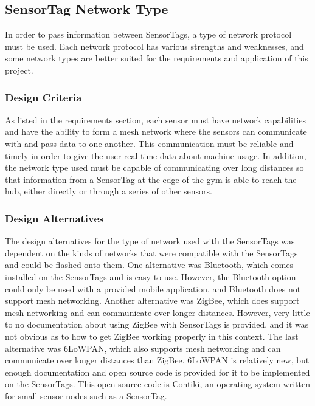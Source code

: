 \documentclass[PPFS.tex]{template/subfiles}
\begin{document}
\subsection{SensorTag Network Type}
In order to pass information between SensorTags, a type of network protocol must be used. Each network protocol has various strengths and weaknesses, and some network types are better suited for the requirements and application of this project.

\subsubsection{Design Criteria}
As listed in the requirements section, each sensor must have network capabilities and have the ability to form a mesh network where the sensors can communicate with and pass data to one another. This communication must be reliable and timely in order to give the user real-time data about machine usage. In addition, the network type used must be capable of communicating over long distances so that information from a SensorTag at the edge of the gym is able to reach the hub, either directly or through a series of other sensors.

\subsubsection{Design Alternatives}
The design alternatives for the type of network used with the SensorTags was dependent on the kinds of networks that were compatible with the SensorTags and could be flashed onto them. One alternative was Bluetooth, which comes installed on the SensorTags and is easy to use. However, the Bluetooth option could only be used with a provided mobile application, and Bluetooth does not support mesh networking. Another alternative was ZigBee, which does support mesh networking and can communicate over longer distances. However, very little to no documentation about using ZigBee with SensorTags is provided, and it was not obvious as to how to get ZigBee working properly in this context. The last alternative was 6LoWPAN, which also supports mesh networking and can communicate over longer distances than ZigBee. 6LoWPAN is relatively new, but enough documentation and open source code is provided for it to be implemented on the SensorTags. This open source code is Contiki, an operating system written for small sensor nodes such as a SensorTag.
\end{document}
